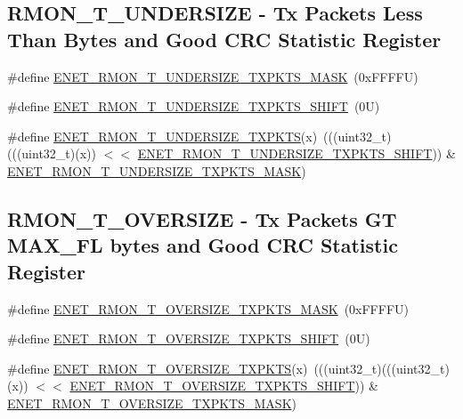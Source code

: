 \subsection*{R\+M\+O\+N\+\_\+\+T\+\_\+\+U\+N\+D\+E\+R\+S\+I\+ZE -\/ Tx Packets Less Than Bytes and Good C\+RC Statistic Register}
\begin{DoxyCompactItemize}
\item 
\#define \mbox{\hyperlink{group___e_n_e_t___register___masks_gac79ab5e21dda24e10c602a553f1096bb}{E\+N\+E\+T\+\_\+\+R\+M\+O\+N\+\_\+\+T\+\_\+\+U\+N\+D\+E\+R\+S\+I\+Z\+E\+\_\+\+T\+X\+P\+K\+T\+S\+\_\+\+M\+A\+SK}}~(0x\+F\+F\+F\+F\+U)
\item 
\#define \mbox{\hyperlink{group___e_n_e_t___register___masks_ga1e9b9d2818563f7ddb3d266af3e5bbfd}{E\+N\+E\+T\+\_\+\+R\+M\+O\+N\+\_\+\+T\+\_\+\+U\+N\+D\+E\+R\+S\+I\+Z\+E\+\_\+\+T\+X\+P\+K\+T\+S\+\_\+\+S\+H\+I\+FT}}~(0\+U)
\item 
\#define \mbox{\hyperlink{group___e_n_e_t___register___masks_ga90299d138525aced7aee63953319e8f4}{E\+N\+E\+T\+\_\+\+R\+M\+O\+N\+\_\+\+T\+\_\+\+U\+N\+D\+E\+R\+S\+I\+Z\+E\+\_\+\+T\+X\+P\+K\+TS}}(x)~(((uint32\+\_\+t)(((uint32\+\_\+t)(x)) $<$$<$ \mbox{\hyperlink{group___e_n_e_t___register___masks_ga1e9b9d2818563f7ddb3d266af3e5bbfd}{E\+N\+E\+T\+\_\+\+R\+M\+O\+N\+\_\+\+T\+\_\+\+U\+N\+D\+E\+R\+S\+I\+Z\+E\+\_\+\+T\+X\+P\+K\+T\+S\+\_\+\+S\+H\+I\+FT}})) \& \mbox{\hyperlink{group___e_n_e_t___register___masks_gac79ab5e21dda24e10c602a553f1096bb}{E\+N\+E\+T\+\_\+\+R\+M\+O\+N\+\_\+\+T\+\_\+\+U\+N\+D\+E\+R\+S\+I\+Z\+E\+\_\+\+T\+X\+P\+K\+T\+S\+\_\+\+M\+A\+SK}})
\end{DoxyCompactItemize}
\subsection*{R\+M\+O\+N\+\_\+\+T\+\_\+\+O\+V\+E\+R\+S\+I\+ZE -\/ Tx Packets GT M\+A\+X\+\_\+\+FL bytes and Good C\+RC Statistic Register}
\begin{DoxyCompactItemize}
\item 
\#define \mbox{\hyperlink{group___e_n_e_t___register___masks_gac24da13e75404927ddc2e7a9f1dc9134}{E\+N\+E\+T\+\_\+\+R\+M\+O\+N\+\_\+\+T\+\_\+\+O\+V\+E\+R\+S\+I\+Z\+E\+\_\+\+T\+X\+P\+K\+T\+S\+\_\+\+M\+A\+SK}}~(0x\+F\+F\+F\+F\+U)
\item 
\#define \mbox{\hyperlink{group___e_n_e_t___register___masks_gaa57896dafe9204df8f2d835281f03114}{E\+N\+E\+T\+\_\+\+R\+M\+O\+N\+\_\+\+T\+\_\+\+O\+V\+E\+R\+S\+I\+Z\+E\+\_\+\+T\+X\+P\+K\+T\+S\+\_\+\+S\+H\+I\+FT}}~(0\+U)
\item 
\#define \mbox{\hyperlink{group___e_n_e_t___register___masks_ga5e08d883d3486d606c248666912ac051}{E\+N\+E\+T\+\_\+\+R\+M\+O\+N\+\_\+\+T\+\_\+\+O\+V\+E\+R\+S\+I\+Z\+E\+\_\+\+T\+X\+P\+K\+TS}}(x)~(((uint32\+\_\+t)(((uint32\+\_\+t)(x)) $<$$<$ \mbox{\hyperlink{group___e_n_e_t___register___masks_gaa57896dafe9204df8f2d835281f03114}{E\+N\+E\+T\+\_\+\+R\+M\+O\+N\+\_\+\+T\+\_\+\+O\+V\+E\+R\+S\+I\+Z\+E\+\_\+\+T\+X\+P\+K\+T\+S\+\_\+\+S\+H\+I\+FT}})) \& \mbox{\hyperlink{group___e_n_e_t___register___masks_gac24da13e75404927ddc2e7a9f1dc9134}{E\+N\+E\+T\+\_\+\+R\+M\+O\+N\+\_\+\+T\+\_\+\+O\+V\+E\+R\+S\+I\+Z\+E\+\_\+\+T\+X\+P\+K\+T\+S\+\_\+\+M\+A\+SK}})
\end{DoxyCompactItemize}
